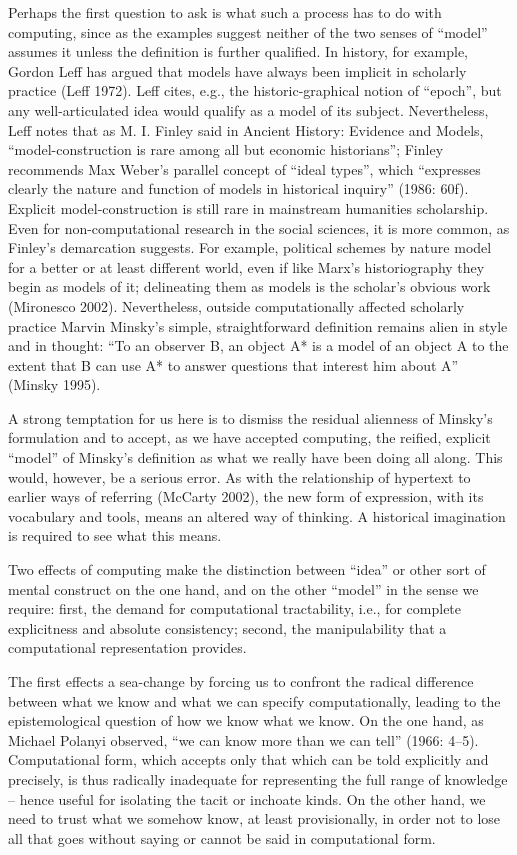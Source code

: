 Perhaps the first question to ask is what such a process has to do with
computing, since as the examples suggest neither of the two senses of
``model'' assumes it unless the definition is further qualified. In
history, for example, Gordon Leff has argued that models have always
been implicit in scholarly practice (Leff 1972). Leff cites, e.g., the
historic-graphical notion of ``epoch'', but any well-articulated idea
would qualify as a model of its subject. Nevertheless, Leff notes that
as M. I. Finley said in Ancient History: Evidence and Models,
``model-construction is rare among all but economic historians''; Finley
recommends Max Weber's parallel concept of ``ideal types'', which
``expresses clearly the nature and function of models in historical
inquiry'' (1986: 60f). Explicit model-construction is still rare in
mainstream humanities scholarship. Even for non-computational research
in the social sciences, it is more common, as Finley's demarcation
suggests. For example, political schemes by nature model for a better or
at least different world, even if like Marx's historiography they begin
as models of it; delineating them as models is the scholar's obvious
work (Mironesco 2002). Nevertheless, outside computationally affected
scholarly practice Marvin Minsky's simple, straightforward definition
remains alien in style and in thought: ``To an observer B, an object A*
is a model of an object A to the extent that B can use A* to answer
questions that interest him about A'' (Minsky 1995).

A strong temptation for us here is to dismiss the residual alienness of
Minsky's formulation and to accept, as we have accepted computing, the
reified, explicit ``model'' of Minsky's definition as what we really
have been doing all along. This would, however, be a serious error. As
with the relationship of hypertext to earlier ways of referring (McCarty
2002), the new form of expression, with its vocabulary and tools, means
an altered way of thinking. A historical imagination is required to see
what this means.

Two effects of computing make the distinction between ``idea'' or other
sort of mental construct on the one hand, and on the other ``model'' in
the sense we require: first, the demand for computational tractability,
i.e., for complete explicitness and absolute consistency; second, the
manipulability that a computational representation provides.

The first effects a sea-change by forcing us to confront the radical
difference between what we know and what we can specify computationally,
leading to the epistemological question of how we know what we know. On
the one hand, as Michael Polanyi observed, ``we can know more than we
can tell'' (1966: 4--5). Computational form, which accepts only that
which can be told explicitly and precisely, is thus radically inadequate
for representing the full range of knowledge -- hence useful for
isolating the tacit or inchoate kinds. On the other hand, we need to
trust what we somehow know, at least provisionally, in order not to lose
all that goes without saying or cannot be said in computational form.

